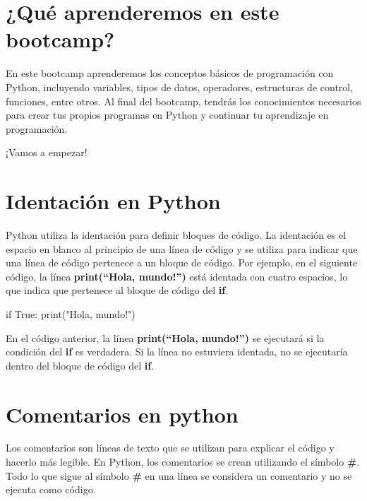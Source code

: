 \documentclass[
  a4paper,
  DIV=11,
  numbers=noendperiod,
  onepage,
  openany]{scrreprt}
\newenvironment{Shaded}{\begin{snugshade}}{\end{snugshade}}
\newcommand{\BuiltInTok}[1]{\textcolor[rgb]{0.00,0.23,0.31}{#1}}
\newcommand{\ControlFlowTok}[1]{\textcolor[rgb]{0.00,0.23,0.31}{#1}}
\newcommand{\NormalTok}[1]{\textcolor[rgb]{0.00,0.23,0.31}{#1}}
\newcommand{\StringTok}[1]{\textcolor[rgb]{0.13,0.47,0.30}{#1}}
\newcommand{\VariableTok}[1]{\textcolor[rgb]{0.07,0.07,0.07}{#1}}
\begin{document}
\section{¿Qué aprenderemos en este
bootcamp?}\label{quuxe9-aprenderemos-en-este-bootcamp}

En este bootcamp aprenderemos los conceptos básicos de programación con
Python, incluyendo variables, tipos de datos, operadores, estructuras de
control, funciones, entre otros. Al final del bootcamp, tendrás los
conocimientos necesarios para crear tus propios programas en Python y
continuar tu aprendizaje en programación.

¡Vamos a empezar!

\section{Identación en Python}\label{identaciuxf3n-en-python}

Python utiliza la identación para definir bloques de código. La
identación es el espacio en blanco al principio de una línea de código y
se utiliza para indicar que una línea de código pertenece a un bloque de
código. Por ejemplo, en el siguiente código, la línea
\textbf{print(``Hola, mundo!'')} está identada con cuatro espacios, lo
que indica que pertenece al bloque de código del \textbf{if}.

\begin{Shaded}
\begin{Highlighting}[]
\ControlFlowTok{if} \VariableTok{True}\NormalTok{:}
    \BuiltInTok{print}\NormalTok{(}\StringTok{"Hola, mundo!"}\NormalTok{)}
\end{Highlighting}
\end{Shaded}

En el código anterior, la línea \textbf{print(``Hola, mundo!'')} se
ejecutará si la condición del \textbf{if} es verdadera. Si la línea no
estuviera identada, no se ejecutaría dentro del bloque de código del
\textbf{if}.

\section{Comentarios en python}\label{comentarios-en-python}

Los comentarios son líneas de texto que se utilizan para explicar el
código y hacerlo más legible. En Python, los comentarios se crean
utilizando el símbolo \textbf{\#}. Todo lo que sigue al símbolo
\textbf{\#} en una línea se considera un comentario y no se ejecuta como
código.
\end{document}
